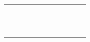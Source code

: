 \begin{landscape}
\begin{longtable}{|c|c|c|c|c|c|c|c|c|c|}
	         &        &      &                        &          &      &        &    &                          &  \\ \hline
	         &        &      &                        &          &      &        &    &                          &  \\ \hline
	         	         &        &      &                        &          &      &        &    &                          &  \\ \hline
	         &        &      &                        &          &      &        &    &                          &  \\ \hline
	         &        &      &                        &          &      &        &    &                          &  \\ \hline
	         &        &      &                        &          &      &        &    &                          &  \\ \hline
	         &        &      &                        &          &      &        &    &                          &  \\ \hline
	         	         &        &      &                        &          &      &        &    &                          &  \\ \hline
	         &        &      &                        &          &      &        &    &                          &  \\ \hline
	         &        &      &                        &          &      &        &    &                          &  \\ \hline
	         &        &      &                        &          &      &        &    &                          &  \\ \hline
	         &        &      &                        &          &      &        &    &                          &  \\ \hline

\end{longtable}
\end{landscape}
\clearpage
\pagestyle{fancy}